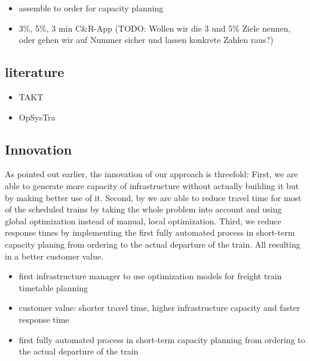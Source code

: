 \begin{itemize}
  \item assemble to order for capacity planning
  \item 3\%, 5\%, 3 min C\&R-App (TODO: Wollen wir die 3 und 5\% Ziele nennen, oder gehen wir auf Nummer sicher und lassen konkrete Zahlen raus?)
\end{itemize}

\subsection{literature}
\begin{itemize}
  \item TAKT
  \item OpSysTra
\end{itemize}

\subsection{Innovation}
As pointed out earlier, the innovation of our approach is threefold: First, we are able to generate more capacity of infrastructure without actually building it but by making better use of it. Second, by we are able to reduce travel time for most of the scheduled trains by taking the whole problem into account and using global optimization instead of manual, local optimization. Third, we reduce response times by implementing the first fully automated process in short-term capacity planing from ordering to the actual departure of the train. All resulting in a better customer value.
\begin{itemize}
  \item first infrastructure manager to use optimization models for freight train timetable planning
  \item customer value: shorter travel time, higher infrastructure capacity and faster response time
  \item first fully automated process in short-term capacity planning from ordering to the actual departure of the train
\end{itemize}

